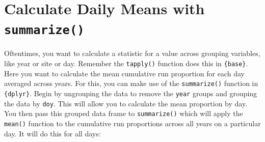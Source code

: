 \documentclass[]{book}
\newenvironment{Shaded}{\begin{snugshade}}{\end{snugshade}}
\newcommand{\KeywordTok}[1]{\textcolor[rgb]{0.13,0.29,0.53}{\textbf{#1}}}
\newcommand{\DataTypeTok}[1]{\textcolor[rgb]{0.13,0.29,0.53}{#1}}
\newcommand{\DecValTok}[1]{\textcolor[rgb]{0.00,0.00,0.81}{#1}}
\newcommand{\StringTok}[1]{\textcolor[rgb]{0.31,0.60,0.02}{#1}}
\newcommand{\CommentTok}[1]{\textcolor[rgb]{0.56,0.35,0.01}{\textit{#1}}}
\newcommand{\ControlFlowTok}[1]{\textcolor[rgb]{0.13,0.29,0.53}{\textbf{#1}}}
\newcommand{\OperatorTok}[1]{\textcolor[rgb]{0.81,0.36,0.00}{\textbf{#1}}}
\newcommand{\NormalTok}[1]{#1}
\theoremstyle{definition}
\theoremstyle{definition}
\theoremstyle{definition}
\theoremstyle{remark}
\begin{document}
\begin{Shaded}
\end{Shaded}

\section{\texorpdfstring{Calculate Daily Means with
\texttt{summarize()}}{Calculate Daily Means with summarize()}}\label{calculate-daily-means-with-summarize}

Oftentimes, you want to calculate a statistic for a value across
grouping variables, like year or site or day. Remember the
\texttt{tapply()} function does this in \texttt{\{base\}}. Here you want
to calculate the mean cumulative run proportion for each day averaged
across years. For this, you can make use of the \texttt{summarize()}
function in \texttt{\{dplyr\}}. Begin by ungrouping the data to remove
the \texttt{year} groups and grouping the data by \texttt{doy}. This
will allow you to calculate the mean proportion by day. You then pass
this grouped data frame to \texttt{summarize()} which will apply the
\texttt{mean()} function to the cumulative run proportions across all
years on a particular day. It will do this for all days:
\end{document}
